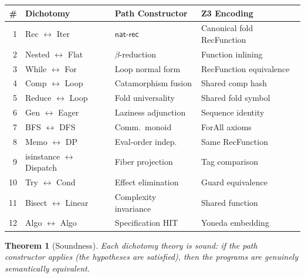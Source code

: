 \documentclass[11pt,a4paper]{report}
\theoremstyle{definition}
\theoremstyle{plain}
\newtheorem{theorem}[definition]{Theorem}
\begin{document}
\begin{center}
\small
\begin{tabular}{r l l l}
  \textbf{\#} & \textbf{Dichotomy} & \textbf{Path Constructor} &
    \textbf{Z3 Encoding} \\
  \hline
  1 & Rec $\leftrightarrow$ Iter &
      $\mathsf{nat\text{-}rec}$ &
      Canonical fold RecFunction \\
  2 & Nested $\leftrightarrow$ Flat &
      $\beta$-reduction &
      Function inlining \\
  3 & While $\leftrightarrow$ For &
      Loop normal form &
      RecFunction equivalence \\
  4 & Comp $\leftrightarrow$ Loop &
      Catamorphism fusion &
      Shared comp hash \\
  5 & Reduce $\leftrightarrow$ Loop &
      Fold universality &
      Shared fold symbol \\
  6 & Gen $\leftrightarrow$ Eager &
      Laziness adjunction &
      Sequence identity \\
  7 & BFS $\leftrightarrow$ DFS &
      Comm.\ monoid &
      ForAll axioms \\
  8 & Memo $\leftrightarrow$ DP &
      Eval-order indep. &
      Same RecFunction \\
  9 & isinstance $\leftrightarrow$ Dispatch &
      Fiber projection &
      Tag comparison \\
  10 & Try $\leftrightarrow$ Cond &
      Effect elimination &
      Guard equivalence \\
  11 & Bisect $\leftrightarrow$ Linear &
      Complexity invariance &
      Shared function \\
  12 & Algo $\leftrightarrow$ Algo &
      Specification HIT &
      Yoneda embedding \\
\end{tabular}
\end{center}

\begin{theorem}[Soundness]
Each dichotomy theory is \emph{sound}: if the path constructor
applies (the hypotheses are satisfied), then the programs are
genuinely semantically equivalent.
\end{theorem}
\end{document}
